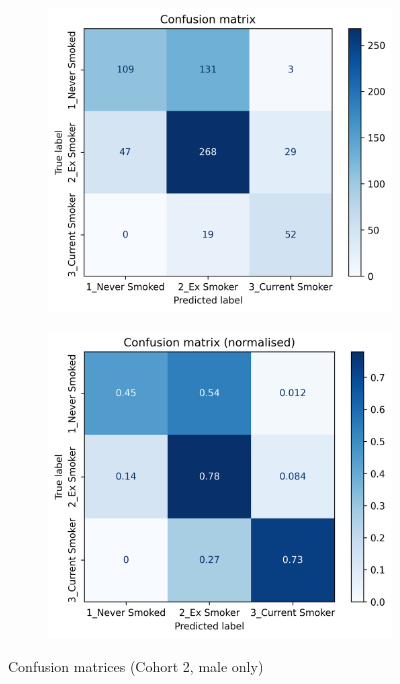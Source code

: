 \documentclass{article} %
\begin{document}
\begin{figure}[p]
    \centering
    \begin{subfigure}{0.45\linewidth}
        \centering
        \includegraphics[width=\linewidth]{cohort2/male_only/test_confusion_matrix.png}
    \end{subfigure}
    \hspace{4mm}
    \begin{subfigure}{0.45\linewidth}
        \centering
        \includegraphics[width=\linewidth]{cohort2/male_only/test_confusion_matrix_normalised.png}
    \end{subfigure}
    \caption[Confusion matrices (Cohort 2, male only)]{Confusion matrices (Cohort 2, male only)}
    \label{fig:male-only-confusion-matrix}
\end{figure}
\end{document}
